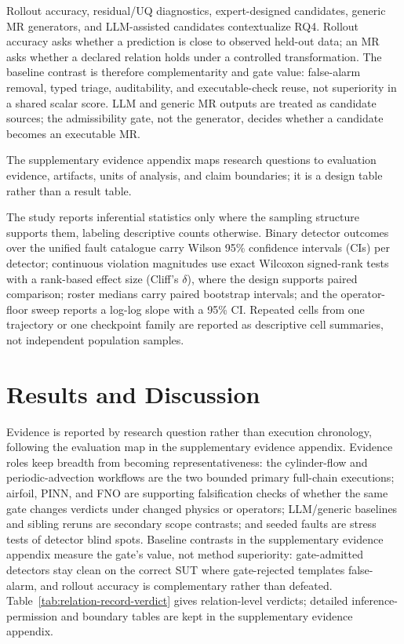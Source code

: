 \documentclass[preprint,12pt,authoryear]{elsarticle}
\begin{document}
Rollout accuracy, residual/UQ diagnostics, expert-designed candidates, generic MR generators, and LLM-assisted candidates contextualize RQ4. Rollout accuracy asks whether a prediction is close to observed held-out data; an MR asks whether a declared relation holds under a controlled transformation. The baseline contrast is therefore complementarity and gate value: false-alarm removal, typed triage, auditability, and executable-check reuse, not superiority in a shared scalar score. LLM and generic MR outputs are treated as candidate sources; the admissibility gate, not the generator, decides whether a candidate becomes an executable MR.

The supplementary evidence appendix maps research questions to evaluation evidence, artifacts, units of analysis, and claim boundaries; it is a design table rather than a result table.

The study reports inferential statistics only where the sampling structure supports them, labeling descriptive counts otherwise. Binary detector outcomes over the unified fault catalogue carry Wilson 95\% confidence intervals (CIs) per detector; continuous violation magnitudes use exact Wilcoxon signed-rank tests with a rank-based effect size (Cliff's $\delta$), where the design supports paired comparison; roster medians carry paired bootstrap intervals; and the operator-floor sweep reports a log-log slope with a 95\% CI. Repeated cells from one trajectory or one checkpoint family are reported as descriptive cell summaries, not independent population samples.

\section{Results and Discussion}
\label{sec:results}

Evidence is reported by research question rather than execution chronology, following the evaluation map in the supplementary evidence appendix. Evidence roles keep breadth from becoming representativeness: the cylinder-flow and periodic-advection workflows are the two bounded primary full-chain executions; airfoil, PINN, and FNO are supporting falsification checks of whether the same gate changes verdicts under changed physics or operators; LLM/generic baselines and sibling reruns are secondary scope contrasts; and seeded faults are stress tests of detector blind spots. Baseline contrasts in the supplementary evidence appendix measure the gate's value, not method superiority: gate-admitted detectors stay clean on the correct SUT where gate-rejected templates false-alarm, and rollout accuracy is complementary rather than defeated. Table~\ref{tab:relation-record-verdict} gives relation-level verdicts; detailed inference-permission and boundary tables are kept in the supplementary evidence appendix.
\end{document}
